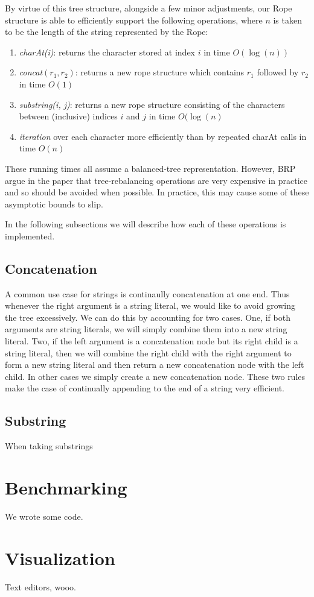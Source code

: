 \documentclass[12pt]{article}
\begin{document}
By virtue of this tree structure, alongside a few minor adjustments, our Rope structure is able to efficiently support the following operations, where $n$ is taken to be the length of the string represented by the Rope:

\begin{enumerate}
\item \emph{charAt(i)}: returns the character stored at index $i$ in time $O(\log(n))$
\item \emph{concat$(r_1, r_2)$}: returns a new rope structure which contains $r_1$ followed by $r_2$ in time $O(1)$
\item \emph{substring(i, j)}: returns a new rope structure consisting of the characters between (inclusive) indices $i$ and $j$ in time $O(\log(n)$
\item \emph{iteration} over each character more efficiently than by repeated charAt calls in time $O(n)$
\end{enumerate}

These running times all assume a balanced-tree representation. However, BRP argue in the paper that tree-rebalancing operations are very expensive in practice and so should be avoided when possible. In practice, this may cause some of these asymptotic bounds to slip. 

In the following subsections we will describe how each of these operations is implemented.

\subsection{Concatenation}

A common use case for strings is continaully concatenation at one end. Thus whenever the right argument is a string literal, we would like to avoid growing the tree excessively. We can do this by accounting for two cases. One, if both arguments are string literals, we will simply combine them into a new string literal. Two, if the left argument is a concatenation node but its right child is a string literal, then we will combine the right child with the right argument to form a new string literal and then return a new concatenation node with the left child. In other cases we simply create a new concatenation node. These two rules make the case of continually appending to the end of a string very efficient.

\subsection{Substring}

When taking substrings 

\section{Benchmarking}

We wrote some code.

\section{Visualization}

Text editors, wooo.
\end{document}
